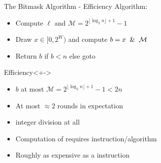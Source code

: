 \begin{frame}{The Bitmask Algorithm - Efficiency}
    Algorithm: \begin{itemize}
        \item[(1)] Compute $\ell$ and $\mathcal{M} = 2^{\lfloor\log_2n\rfloor + 1} - 1$
        \item[(2)] Draw $x \in [0,2^W)$ and compute $b = x \And \mathcal{M}$
        \item[(3)] Return $b$ if $b < n$ else goto \textbf{}
    \end{itemize}
    \pause 
    \smallskip
    \begin{block}{Efficiency}<+->
        \begin{itemize}[<+->]
            \item $b$ at most $\mathcal{M} = 2^{\lfloor\log_2n\rfloor + 1} - 1 < 2n$ 
            \item At most $\approx 2$ rounds in expectation
            \item {} integer division at all
            \item Computation of  requires  instruction/algorithm 
            \item Roughly as expensive as a  instruction 
        \end{itemize}
    \end{block}
\end{frame}